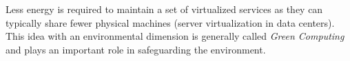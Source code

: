 	
	Less energy is required to maintain a set of virtualized services as they can typically share fewer physical machines (server virtualization in data centers). This idea with an environmental dimension is generally called \textit{Green Computing} \cite {Thathera2015, Ranjith2017, Jing2011} and plays an important role in safeguarding the environment.
	
	 
	
	

	 
	
	
